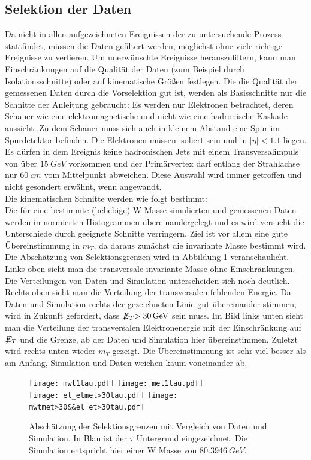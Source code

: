 \documentclass[a4paper,12pt]{article}
\newcommand{\met}{\ensuremath{\not\mathrel{E}}_T}
\begin{document}
\subsection{Selektion der Daten}
Da nicht in allen aufgezeichneten Ereignissen der zu untersuchende Prozess stattfindet, müssen die
Daten gefiltert werden, möglichst ohne viele richtige Ereignisse zu verlieren.
Um unerwünschte Ereignisse herauszufiltern, kann man Einschränkungen auf die Qualität der Daten (zum Beispiel
durch Isolationsschnitte) oder auf kinematische Größen festlegen.
Die die Qualität der gemessenen Daten durch die Vorselektion gut ist, werden als Basisschnitte nur
die Schnitte der Anleitung gebraucht: Es werden nur
Elektronen betrachtet, deren Schauer wie eine elektromagnetische und nicht wie eine hadronische
Kaskade aussieht. Zu dem Schauer muss sich auch in kleinem Abstand eine Spur im Spurdetektor befinden.
Die Elektronen müssen isoliert sein und in $|\eta| < 1.1$ liegen. Es dürfen in dem Ereignis keine
hadronischen Jets mit einem Transversalimpuls von über $\SI{15}{GeV}$ vorkommen und der Primärvertex
darf entlang der Strahlachse nur $\SI{60}{cm}$ vom Mittelpunkt abweichen. Diese Auswahl wird immer
getroffen und nicht gesondert erwähnt, wenn angewandt.\\
Die kinematischen Schnitte werden wie folgt bestimmt:\\
Die für eine bestimmte (beliebige) W-Masse simulierten und gemessenen Daten werden in normierten Histogrammen übereinandergelegt
und es wird versucht die Unterschiede durch geeignete Schnitte verringern. Ziel ist vor allem eine gute
Übereinstimmung in $m_T$, da daraus zunächst die invariante Masse bestimmt wird. Die Abschätzung von Selektionsgrenzen
wird in Abbildung \ref{fig:abschaetzung} veranschaulicht. Links oben sieht man die transversale
invariante Masse ohne Einschränkungen. Die Verteilungen von Daten und Simulation unterscheiden sich
noch deutlich. Rechts oben sieht man die Verteilung der transversalen
fehlenden Energie. Da Daten und Simulation rechts der gezeichneten Linie gut übereinander stimmen,
wird in Zukunft gefordert, dass $\met > \SI{30}{GeV}$ sein muss. Im Bild links unten sieht man die
Verteilung der transversalen Elektronenergie mit der Einschränkung auf $\met$ und die Grenze, ab der Daten und Simulation hier
übereinstimmen. Zuletzt wird rechts unten wieder $m_T$ gezeigt. Die Übereinstimmung ist sehr viel
besser als am Anfang, Simulation und Daten weichen kaum voneinander ab.

\begin{figure}[h]
	\centering
	\texttt{[image: mwt1tau.pdf]}
	\texttt{[image: met1tau.pdf]}\\
	\texttt{[image: el\_etmet>30tau.pdf]}
	\texttt{[image: mwtmet>30\&\&el\_et>30tau.pdf]}
	\caption{Abschätzung der Selektionsgrenzen mit Vergleich von Daten und Simulation. In Blau ist
	der $τ$ Untergrund eingezeichnet. Die Simulation entspricht hier einer W Masse von
	$\SI{80.3946}{GeV}$.}
	\label{fig:abschaetzung}
\end{figure}
\end{document}
